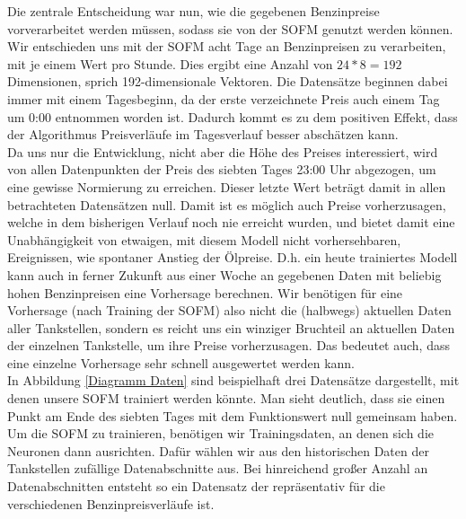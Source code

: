 \documentclass[11pt]{article}
\begin{document}
	Die zentrale Entscheidung war nun, wie die gegebenen Benzinpreise vorverarbeitet werden müssen, sodass sie von der SOFM genutzt werden können. Wir entschieden uns mit der SOFM acht Tage an Benzinpreisen zu verarbeiten, mit je einem Wert pro Stunde. Dies ergibt eine Anzahl von $ 24 * 8 = 192 $ Dimensionen, sprich 192-dimensionale Vektoren. Die Datensätze beginnen dabei immer mit einem Tagesbeginn, da der erste verzeichnete Preis auch einem Tag um 0:00 entnommen worden ist. Dadurch kommt es zu dem positiven Effekt, dass der Algorithmus Preisverläufe im Tagesverlauf besser abschätzen kann.\\
	Da uns nur die Entwicklung, nicht aber die Höhe des Preises interessiert, wird von allen Datenpunkten der Preis des siebten Tages 23:00 Uhr abgezogen, um eine gewisse Normierung zu erreichen. Dieser letzte Wert beträgt damit in allen betrachteten Datensätzen null. Damit ist es möglich auch Preise vorherzusagen, welche in dem bisherigen Verlauf noch nie erreicht wurden, und bietet damit eine Unabhängigkeit von etwaigen, mit diesem Modell nicht vorhersehbaren, Ereignissen, wie spontaner Anstieg der Ölpreise. D.h. ein heute trainiertes Modell kann auch in ferner Zukunft aus einer Woche an gegebenen Daten mit beliebig hohen Benzinpreisen eine Vorhersage berechnen. Wir benötigen für eine Vorhersage (nach Training der SOFM) also nicht die (halbwegs) aktuellen Daten aller Tankstellen, sondern es reicht uns ein winziger Bruchteil an aktuellen Daten der einzelnen Tankstelle, um ihre Preise vorherzusagen. Das bedeutet auch, dass eine einzelne Vorhersage sehr schnell ausgewertet werden kann.\\
	In Abbildung \ref{Diagramm Daten} sind beispielhaft drei Datensätze dargestellt, mit denen unsere SOFM trainiert werden könnte. Man sieht deutlich, dass sie einen Punkt am Ende des siebten Tages mit dem Funktionswert null gemeinsam haben. \\
	Um die SOFM zu trainieren, benötigen wir Trainingsdaten, an denen sich die Neuronen dann ausrichten. Dafür wählen wir aus den historischen Daten der Tankstellen zufällige Datenabschnitte aus. Bei hinreichend großer Anzahl an Datenabschnitten entsteht so ein Datensatz der repräsentativ für die verschiedenen Benzinpreisverläufe ist.\\
	
\end{document}
